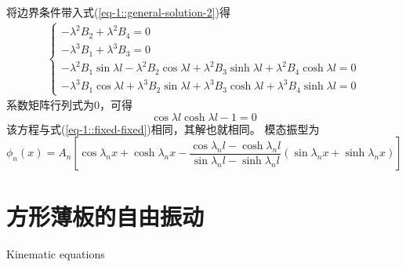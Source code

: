 将边界条件带入式(\ref{eq-1::general-solution-2})得
\begin{equation}
    \begin{aligned}
        \left\{\begin{array}{l}
            -\lambda^{2}B_{2} + \lambda^{2}B_{4} = 0\\
            -\lambda^{3}B_{1} + \lambda^{3} B_{3} = 0\\
            -\lambda^{2}B_{1}\sin \lambda l - \lambda^{2}B_{2}\cos \lambda l + \lambda^{2}B_{3}\sinh \lambda l + \lambda^{2}B_{4}\cosh \lambda l= 0\\
            -\lambda^{3}B_{1}\cos \lambda l + \lambda^{3}B_{2}\sin \lambda l + \lambda^{3}B_{3}\cosh \lambda l + \lambda^{3}B_{4}\sinh \lambda l= 0
        \end{array}\right.
    \end{aligned}
\end{equation}
系数矩阵行列式为0，可得
\begin{equation}
    \cos \lambda l \cosh \lambda l - 1=0
\end{equation}
该方程与式(\ref{eq-1::fixed-fixed})相同，其解也就相同。
模态振型为
\begin{equation}
    \phi_{n}(x)=A_{n}\left[\cos\lambda_{n}x + \cosh\lambda_{n}x - 
    \frac{\cos\lambda_{n}l - \cosh\lambda_{n}l}{\sin\lambda_{n}l - \sinh\lambda_{n}l}
    \left(\sin\lambda_{n}x + \sinh\lambda_{n}x\right)\right]    
\end{equation}

\section{方形薄板的自由振动}

Kinematic equations

